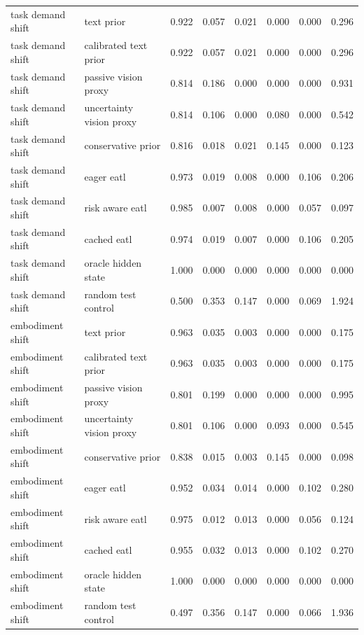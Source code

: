 \begin{longtable}{llrrrrrr}
\midrule
task demand shift & text prior & 0.922 & 0.057 & 0.021 & 0.000 & 0.000 & 0.296 \\
task demand shift & calibrated text prior & 0.922 & 0.057 & 0.021 & 0.000 & 0.000 & 0.296 \\
task demand shift & passive vision proxy & 0.814 & 0.186 & 0.000 & 0.000 & 0.000 & 0.931 \\
task demand shift & uncertainty vision proxy & 0.814 & 0.106 & 0.000 & 0.080 & 0.000 & 0.542 \\
task demand shift & conservative prior & 0.816 & 0.018 & 0.021 & 0.145 & 0.000 & 0.123 \\
task demand shift & eager eatl & 0.973 & 0.019 & 0.008 & 0.000 & 0.106 & 0.206 \\
task demand shift & risk aware eatl & 0.985 & 0.007 & 0.008 & 0.000 & 0.057 & 0.097 \\
task demand shift & cached eatl & 0.974 & 0.019 & 0.007 & 0.000 & 0.106 & 0.205 \\
task demand shift & oracle hidden state & 1.000 & 0.000 & 0.000 & 0.000 & 0.000 & 0.000 \\
task demand shift & random test control & 0.500 & 0.353 & 0.147 & 0.000 & 0.069 & 1.924 \\
\midrule
embodiment shift & text prior & 0.963 & 0.035 & 0.003 & 0.000 & 0.000 & 0.175 \\
embodiment shift & calibrated text prior & 0.963 & 0.035 & 0.003 & 0.000 & 0.000 & 0.175 \\
embodiment shift & passive vision proxy & 0.801 & 0.199 & 0.000 & 0.000 & 0.000 & 0.995 \\
embodiment shift & uncertainty vision proxy & 0.801 & 0.106 & 0.000 & 0.093 & 0.000 & 0.545 \\
embodiment shift & conservative prior & 0.838 & 0.015 & 0.003 & 0.145 & 0.000 & 0.098 \\
embodiment shift & eager eatl & 0.952 & 0.034 & 0.014 & 0.000 & 0.102 & 0.280 \\
embodiment shift & risk aware eatl & 0.975 & 0.012 & 0.013 & 0.000 & 0.056 & 0.124 \\
embodiment shift & cached eatl & 0.955 & 0.032 & 0.013 & 0.000 & 0.102 & 0.270 \\
embodiment shift & oracle hidden state & 1.000 & 0.000 & 0.000 & 0.000 & 0.000 & 0.000 \\
embodiment shift & random test control & 0.497 & 0.356 & 0.147 & 0.000 & 0.066 & 1.936 \\
\bottomrule
\end{longtable}
